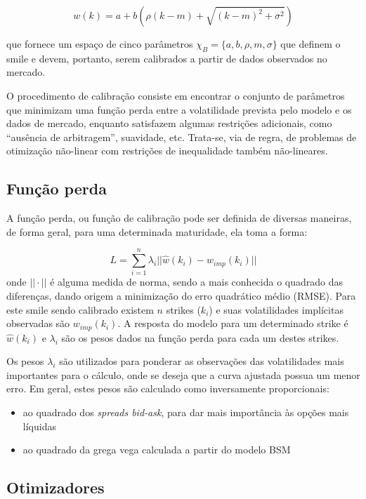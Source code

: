 \documentclass[]{book}
\providecommand{\tightlist}{%
  \setlength{\itemsep}{0pt}\setlength{\parskip}{0pt}}
\begin{document}
\[ w(k) = a + b\left(\rho(k-m)+\sqrt{(k-m)^2 + \sigma^2}\right)\]

que fornece um espaço de cinco parâmetros
\(\chi_B=\{a, b, \rho, m, \sigma\}\) que definem o smile e devem,
portanto, serem calibrados a partir de dados observados no mercado.

O procedimento de calibração consiste em encontrar o conjunto de
parâmetros que minimizam uma função perda entre a volatilidade prevista
pelo modelo e os dados de mercado, enquanto satisfazem algumas
restrições adicionais, como ``ausência de arbitragem'', suavidade, etc.
Trata-se, via de regra, de problemas de otimização não-linear com
restrições de inequalidade também não-lineares.

\subsection{Função perda}\label{funcao-perda}

A função perda, ou função de calibração pode ser definida de diversas
maneiras, de forma geral, para uma determinada maturidade, ela toma a
forma:

\[L=\sum\limits_{i=1}^n\lambda_i||\hat w(k_i)-w_{imp}(k_i)||\] onde
\(||\cdot||\) é alguma medida de norma, sendo a mais conhecida o
quadrado das diferenças, dando origem a minimização do erro quadrático
médio (RMSE). Para este smile sendo calibrado existem \(n\) strikes
(\(k_i\)) e suas volatilidades implícitas observadas são
\(w_{imp}(k_i)\). A resposta do modelo para um determinado strike é
\(\hat w(k_i)\) e \(\lambda_i\) são os pesos dados na função perda para
cada um destes strikes.

Os pesos \(\lambda_i\) são utilizados para ponderar as observações das
volatilidades mais importantes para o cálculo, onde se deseja que a
curva ajustada possua um menor erro. Em geral, estes pesos são calculado
como inversamente proporcionais:

\begin{itemize}
\tightlist
\item
  ao quadrado dos \emph{spreads bid-ask}, para dar mais importância às
  opções mais líquidas
\item
  ao quadrado da grega vega calculada a partir do modelo BSM
\end{itemize}

\subsection{Otimizadores}\label{otimizadores}
\end{document}
